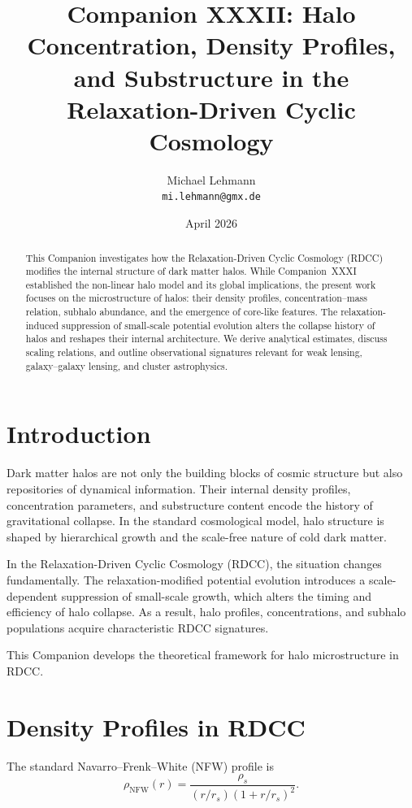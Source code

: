 \documentclass[11pt,a4paper]{article}
\title{\textbf{Companion XXXII: Halo Concentration, Density Profiles, and Substructure in the Relaxation-Driven Cyclic Cosmology}}
\author{Michael Lehmann \\ \texttt{mi.lehmann@gmx.de}}
\date{April 2026}
\begin{document}
\maketitle

\begin{abstract}
This Companion investigates how the Relaxation-Driven Cyclic Cosmology (RDCC) modifies 
the internal structure of dark matter halos. While Companion~XXXI established the 
non-linear halo model and its global implications, the present work focuses on the 
microstructure of halos: their density profiles, concentration--mass relation, 
subhalo abundance, and the emergence of core-like features. The relaxation-induced 
suppression of small-scale potential evolution alters the collapse history of halos 
and reshapes their internal architecture. We derive analytical estimates, discuss 
scaling relations, and outline observational signatures relevant for weak lensing, 
galaxy--galaxy lensing, and cluster astrophysics.
\end{abstract}
\section{Introduction}

Dark matter halos are not only the building blocks of cosmic structure but also 
repositories of dynamical information. Their internal density profiles, concentration 
parameters, and substructure content encode the history of gravitational collapse. 
In the standard cosmological model, halo structure is shaped by hierarchical growth 
and the scale-free nature of cold dark matter.

In the Relaxation-Driven Cyclic Cosmology (RDCC), the situation changes 
fundamentally. The relaxation-modified potential evolution introduces a 
scale-dependent suppression of small-scale growth, which alters the timing and 
efficiency of halo collapse. As a result, halo profiles, concentrations, and 
subhalo populations acquire characteristic RDCC signatures.

This Companion develops the theoretical framework for halo microstructure in RDCC.
\section{Density Profiles in RDCC}

The standard Navarro–Frenk–White (NFW) profile is
\begin{equation}
    \rho_{\mathrm{NFW}}(r)
    = \frac{\rho_{s}}{(r/r_{s})(1+r/r_{s})^{2}}.
\end{equation}
\end{document}
